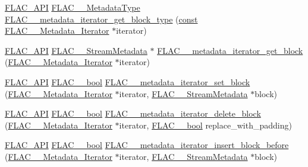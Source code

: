\begin{DoxyCompactItemize}
\hyperlink{group__flac__export_ga56ca07df8a23310707732b1c0007d6f5}{F\+L\+A\+C\+\_\+\+A\+PI} \hyperlink{group__flac__format_gac71714ba8ddbbd66d26bb78a427fac01}{F\+L\+A\+C\+\_\+\+\_\+\+Metadata\+Type} \hyperlink{group__flac__metadata__level2_ga8221ea86b62119785c774aaece48a29b}{F\+L\+A\+C\+\_\+\+\_\+metadata\+\_\+iterator\+\_\+get\+\_\+block\+\_\+type} (\hyperlink{zconf_8h_a2c212835823e3c54a8ab6d95c652660e}{const} \hyperlink{group__flac__metadata__level2_ga9f3e135a07cdef7e51597646aa7b89b2}{F\+L\+A\+C\+\_\+\+\_\+\+Metadata\+\_\+\+Iterator} $\ast$iterator)
\item 
\hyperlink{group__flac__export_ga56ca07df8a23310707732b1c0007d6f5}{F\+L\+A\+C\+\_\+\+A\+PI} \hyperlink{struct_f_l_a_c_____stream_metadata}{F\+L\+A\+C\+\_\+\+\_\+\+Stream\+Metadata} $\ast$ \hyperlink{group__flac__metadata__level2_ga4a2b00a4312d178a9f55c2e2f8b08904}{F\+L\+A\+C\+\_\+\+\_\+metadata\+\_\+iterator\+\_\+get\+\_\+block} (\hyperlink{group__flac__metadata__level2_ga9f3e135a07cdef7e51597646aa7b89b2}{F\+L\+A\+C\+\_\+\+\_\+\+Metadata\+\_\+\+Iterator} $\ast$iterator)
\item 
\hyperlink{group__flac__export_ga56ca07df8a23310707732b1c0007d6f5}{F\+L\+A\+C\+\_\+\+A\+PI} \hyperlink{ordinals_8h_a95103469f1cbd78b8cf250194985b34e}{F\+L\+A\+C\+\_\+\+\_\+bool} \hyperlink{group__flac__metadata__level2_gab40c33a0bf35a2932a5c13f5230e0d9e}{F\+L\+A\+C\+\_\+\+\_\+metadata\+\_\+iterator\+\_\+set\+\_\+block} (\hyperlink{group__flac__metadata__level2_ga9f3e135a07cdef7e51597646aa7b89b2}{F\+L\+A\+C\+\_\+\+\_\+\+Metadata\+\_\+\+Iterator} $\ast$iterator, \hyperlink{struct_f_l_a_c_____stream_metadata}{F\+L\+A\+C\+\_\+\+\_\+\+Stream\+Metadata} $\ast$block)
\item 
\hyperlink{group__flac__export_ga56ca07df8a23310707732b1c0007d6f5}{F\+L\+A\+C\+\_\+\+A\+PI} \hyperlink{ordinals_8h_a95103469f1cbd78b8cf250194985b34e}{F\+L\+A\+C\+\_\+\+\_\+bool} \hyperlink{group__flac__metadata__level2_ga18fdaae4986696dc000cae6357810f7b}{F\+L\+A\+C\+\_\+\+\_\+metadata\+\_\+iterator\+\_\+delete\+\_\+block} (\hyperlink{group__flac__metadata__level2_ga9f3e135a07cdef7e51597646aa7b89b2}{F\+L\+A\+C\+\_\+\+\_\+\+Metadata\+\_\+\+Iterator} $\ast$iterator, \hyperlink{ordinals_8h_a95103469f1cbd78b8cf250194985b34e}{F\+L\+A\+C\+\_\+\+\_\+bool} replace\+\_\+with\+\_\+padding)
\item 
\hyperlink{group__flac__export_ga56ca07df8a23310707732b1c0007d6f5}{F\+L\+A\+C\+\_\+\+A\+PI} \hyperlink{ordinals_8h_a95103469f1cbd78b8cf250194985b34e}{F\+L\+A\+C\+\_\+\+\_\+bool} \hyperlink{group__flac__metadata__level2_ga163c1b4d8fdd72c0d6fb8816b2ae9b18}{F\+L\+A\+C\+\_\+\+\_\+metadata\+\_\+iterator\+\_\+insert\+\_\+block\+\_\+before} (\hyperlink{group__flac__metadata__level2_ga9f3e135a07cdef7e51597646aa7b89b2}{F\+L\+A\+C\+\_\+\+\_\+\+Metadata\+\_\+\+Iterator} $\ast$iterator, \hyperlink{struct_f_l_a_c_____stream_metadata}{F\+L\+A\+C\+\_\+\+\_\+\+Stream\+Metadata} $\ast$block)

\end{DoxyCompactItemize}
